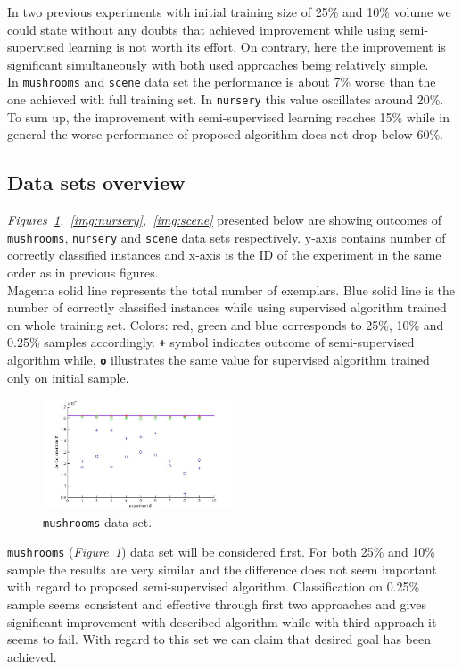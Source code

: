 \documentclass[12pt, a4paper, pdflatex]{report}
\begin{document}
In two previous experiments with initial training size of 25\% and 10\% volume we could state without any doubts that achieved improvement while using semi-supervised learning is not worth its effort. On contrary, here the improvement is significant simultaneously with both used approaches being relatively simple.\\
In \texttt{mushrooms} and \texttt{scene} data set the performance is about 7\% worse than the one achieved with full training set. In \texttt{nursery} this value oscillates around 20\%.\\
To sum up, the improvement with semi-supervised learning reaches 15\% while in general the worse performance of proposed algorithm does not drop below 60\%.



\subsection{Data sets overview}
\emph{Figures~\ref{img:mushrooms},~\ref{img:nursery},~\ref{img:scene}} presented below are showing outcomes of \texttt{mushrooms}, \texttt{nursery} and \texttt{scene} data sets respectively. y-axis contains number of correctly classified instances and x-axis is the ID of the experiment in the same order as in previous figures.\\
Magenta solid line represents the total number of exemplars. Blue solid line is the number of correctly classified instances while using supervised algorithm trained on whole training set. Colors: red, green and blue corresponds to 25\%, 10\% and 0.25\% samples accordingly. \texttt{\textbf{+}} symbol indicates outcome of semi-supervised algorithm while, \texttt{\textbf{o}} illustrates the same value for supervised algorithm trained only on initial sample.\\

\begin{figure}[htbp]
	\centering
	\includegraphics[width=0.5\textwidth]{graphics/figures/fig1.jpg}
	\begin{tiny}
		\caption{\small \texttt{mushrooms} data set.\label{img:mushrooms}}
	\end{tiny}
\end{figure}
\texttt{mushrooms} (\emph{Figure~\ref{img:mushrooms}}) data set will be considered first. For both 25\% and 10\% sample the results are very similar and the difference does not seem important with regard to proposed semi-supervised algorithm. Classification on 0.25\% sample seems consistent and effective through first two approaches and gives significant improvement with described algorithm while with third approach it seems to fail. With regard to this set we can claim that desired goal has been achieved.\\
\end{document}
